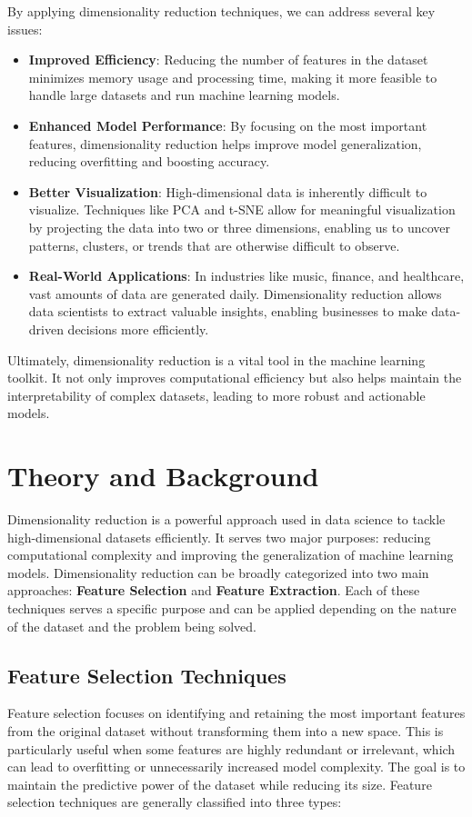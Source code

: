 \documentclass{article}
\begin{document}
By applying dimensionality reduction techniques, we can address several key issues:
\begin{itemize}
    \item \textbf{Improved Efficiency}: Reducing the number of features in the dataset minimizes memory usage and processing time, making it more feasible to handle large datasets and run machine learning models.
    \item \textbf{Enhanced Model Performance}: By focusing on the most important features, dimensionality reduction helps improve model generalization, reducing overfitting and boosting accuracy.
    \item \textbf{Better Visualization}: High-dimensional data is inherently difficult to visualize. Techniques like PCA and t-SNE allow for meaningful visualization by projecting the data into two or three dimensions, enabling us to uncover patterns, clusters, or trends that are otherwise difficult to observe.
    \item \textbf{Real-World Applications}: In industries like music, finance, and healthcare, vast amounts of data are generated daily. Dimensionality reduction allows data scientists to extract valuable insights, enabling businesses to make data-driven decisions more efficiently.
\end{itemize}

Ultimately, dimensionality reduction is a vital tool in the machine learning toolkit. It not only improves computational efficiency but also helps maintain the interpretability of complex datasets, leading to more robust and actionable models.

\section{Theory and Background}

Dimensionality reduction is a powerful approach used in data science to tackle high-dimensional datasets efficiently. It serves two major purposes: reducing computational complexity and improving the generalization of machine learning models. Dimensionality reduction can be broadly categorized into two main approaches: \textbf{Feature Selection} and \textbf{Feature Extraction}. Each of these techniques serves a specific purpose and can be applied depending on the nature of the dataset and the problem being solved.

\subsection{Feature Selection Techniques}
Feature selection focuses on identifying and retaining the most important features from the original dataset without transforming them into a new space. This is particularly useful when some features are highly redundant or irrelevant, which can lead to overfitting or unnecessarily increased model complexity. The goal is to maintain the predictive power of the dataset while reducing its size. Feature selection techniques are generally classified into three types:
\end{document}
